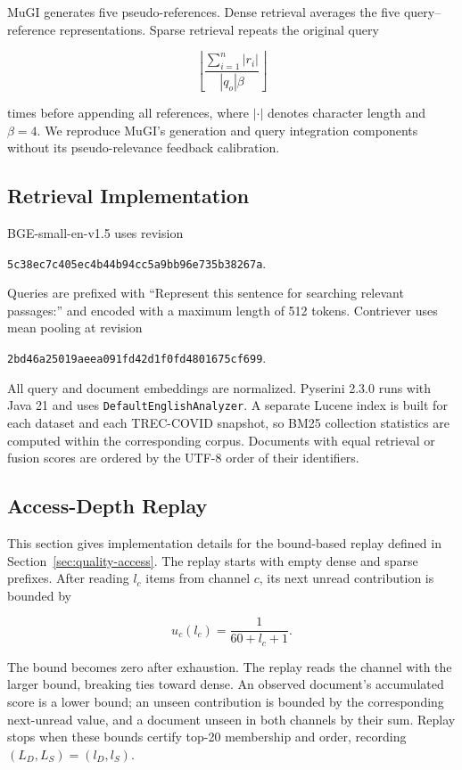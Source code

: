 MuGI generates five pseudo-references. Dense retrieval averages the five query--reference representations. Sparse retrieval repeats the original query

\[\left\lfloor\frac{\sum_{i=1}^{n}|r_i|}{|q_o|\beta}\right\rfloor\]

times before appending all references, where \(|\cdot|\) denotes character length and \(\beta=4\). We reproduce MuGI's generation and query integration components without its pseudo-relevance feedback calibration.

\subsection{Retrieval Implementation}

\label{retrieval-implementation}

BGE-small-en-v1.5 uses revision

{\footnotesize\texttt{5c38ec7c405ec4b44b94cc5a9bb96e735b38267a}}.

Queries are prefixed with ``Represent this sentence for searching relevant passages:'' and encoded with a maximum length of 512 tokens. Contriever uses mean pooling at revision

{\footnotesize\texttt{2bd46a25019aeea091fd42d1f0fd4801675cf699}}.

All query and document embeddings are normalized. Pyserini 2.3.0 runs with Java 21 and uses \texttt{DefaultEnglishAnalyzer}. A separate Lucene index is built for each dataset and each TREC-COVID snapshot, so BM25 collection statistics are computed within the corresponding corpus. Documents with equal retrieval or fusion scores are ordered by the UTF-8 order of their identifiers.

\subsection{Access-Depth Replay}

\label{access-depth-replay}

This section gives implementation details for the bound-based replay defined in Section~\ref{sec:quality-access}. The replay starts with empty dense and sparse prefixes. After reading \(l_c\) items from channel \(c\), its next unread contribution is bounded by

\[u_c(l_c)=\frac{1}{60+l_c+1}.\]

The bound becomes zero after exhaustion. The replay reads the channel with the larger bound, breaking ties toward dense. An observed document's accumulated score is a lower bound; an unseen contribution is bounded by the corresponding next-unread value, and a document unseen in both channels by their sum. Replay stops when these bounds certify top-20 membership and order, recording \((L_D,L_S)=(l_D,l_S)\).

